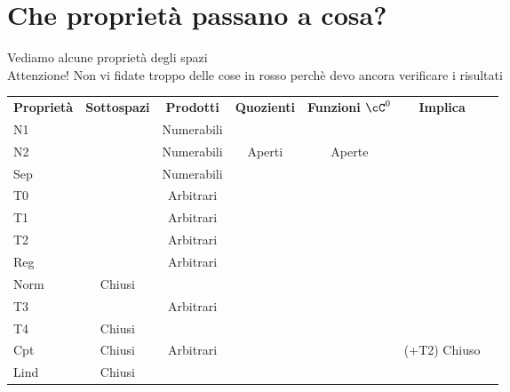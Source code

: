 \documentclass[a4paper,NoNotes,GeneralMath]{stdmdoc}
\newcommand{\Arbitrari}{Arbitrari}
\newcommand{\Numerabili}{Numerabili}
\newcommand{\rd}[1]{{\color{red} #1 }}
\begin{document}
	\section*{Che proprietà passano a cosa?}
	Vediamo alcune proprietà degli spazi \\
	Attenzione! Non vi fidate troppo delle cose in rosso perchè devo ancora verificare i risultati \\
	\begin{tabular}{lcccccc}
	{\bf Proprietà} & {\bf Sottospazi} & {\bf Prodotti} & {\bf Quozienti} & {\bf Funzioni $\cC^0$} & {\bf Implica} \\
	N1              & \rd\checkmark    & \rd\Numerabili &                 &                        &               \\ \hline
	N2              & \rd\checkmark    & \rd\Numerabili & \rd{Aperti}     & \rd{Aperte}            &               \\ \hline
	Sep             & \crossmark       & \Numerabili    &                 & \checkmark             &               \\ \hline
	T0              & \checkmark       & \Arbitrari     &                 &                        &               \\ \hline

	T1              & \checkmark       & \Arbitrari     &                 &                        &               \\ \hline
	T2              & \checkmark       & \Arbitrari     &                 &                        &               \\ \hline
	Reg             & \rd\checkmark    & \rd\Arbitrari  &                 &                        &               \\ \hline
	Norm            & \rd{Chiusi}      & \rd\crossmark  &                 &                        &               \\ \hline

	T3              & \rd\checkmark    & \rd\Arbitrari  &                 &                        &               \\ \hline
	T4              & \rd{Chiusi}      & \rd\crossmark  &                 &                        &               \\ \hline
	Cpt             & Chiusi           & \rd\Arbitrari  &                 & \checkmark             & (+T2) Chiuso  \\ \hline
	Lind            & Chiusi           & \rd\crossmark  &                 &                        &               \\ \hline


\end{tabular}
\end{document}
